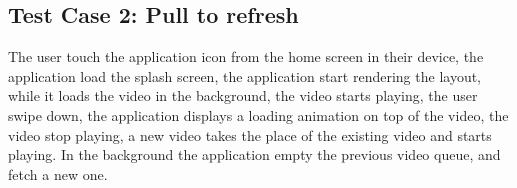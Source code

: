 \documentclass[a4paper,10pt]{article}
\begin{document}
\subsection{Test Case 2: Pull to refresh}
The user touch the application icon from the home screen in their device, the 
application load the splash screen, the application start rendering the layout,
while it loads the video in the background, the video starts playing, the user 
swipe down, the application displays a loading animation on top of the video, 
the video stop playing, a new video takes the place of the existing video and 
starts playing. In the background the application empty the previous video 
queue, and fetch a new one.
\end{document}
